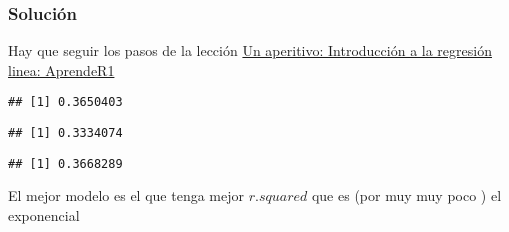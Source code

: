\documentclass[
]{article}
\newenvironment{Shaded}{\begin{snugshade}}{\end{snugshade}}
\newcommand{\CommentTok}[1]{\textcolor[rgb]{0.56,0.35,0.01}{\textit{#1}}}
\newcommand{\DataTypeTok}[1]{\textcolor[rgb]{0.13,0.29,0.53}{#1}}
\newcommand{\KeywordTok}[1]{\textcolor[rgb]{0.13,0.29,0.53}{\textbf{#1}}}
\newcommand{\NormalTok}[1]{#1}
\newcommand{\OperatorTok}[1]{\textcolor[rgb]{0.81,0.36,0.00}{\textbf{#1}}}
\begin{document}
\hypertarget{soluciuxf3n-8}{%
\subsubsection{Solución}\label{soluciuxf3n-8}}

Hay que seguir los pasos de la lección
\href{https://aprender-uib.github.io/AprendeR1/chap-lm.html}{Un
aperitivo: Introducción a la regresión linea: AprendeR1}

\begin{Shaded}
\end{Shaded}

\begin{verbatim}
## [1] 0.3650403
\end{verbatim}

\begin{Shaded}
\end{Shaded}

\begin{verbatim}
## [1] 0.3334074
\end{verbatim}

\begin{Shaded}
\end{Shaded}

\begin{verbatim}
## [1] 0.3668289
\end{verbatim}

El mejor modelo es el que tenga mejor \(r.squared\) que es (por muy muy
poco ) el exponencial
\end{document}
